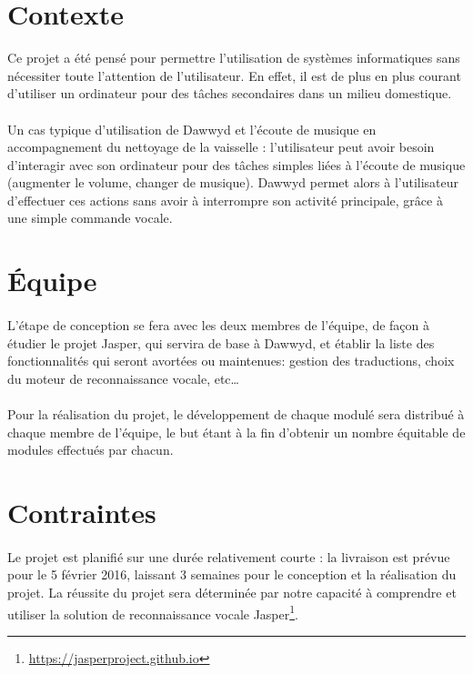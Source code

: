 \documentclass[12pt]{article}
\begin{document}
    \section{Contexte}

Ce projet a été pensé pour permettre l'utilisation de systèmes informatiques
sans nécessiter toute l'attention de l'utilisateur. En effet, il est de plus en
plus courant d'utiliser un ordinateur pour des tâches secondaires dans un
milieu domestique.

\paragraph{}
Un cas typique d'utilisation de Dawwyd et l'écoute de musique
en accompagnement du nettoyage de la vaisselle : l'utilisateur peut avoir
besoin d'interagir avec son ordinateur pour des tâches simples liées à l'écoute
de musique (augmenter le volume, changer de musique).
Dawwyd permet alors à l'utilisateur d'effectuer ces actions sans avoir à
interrompre son activité principale, grâce à une simple commande vocale.

    \section{Équipe}

\paragraph{}
L'étape de conception se fera avec les deux membres de l'équipe, de façon à
étudier le projet Jasper, qui servira de base à Dawwyd, et établir la liste des
fonctionnalités qui seront avortées ou maintenues: gestion des traductions,
choix du moteur de reconnaissance vocale, etc\dots

\paragraph{}
Pour la réalisation du projet, le développement de chaque modulé sera
distribué à chaque membre de l'équipe, le but étant à la fin d'obtenir un
nombre équitable de modules effectués par chacun.

    \section{Contraintes}

\paragraph{}
Le projet est planifié sur une durée relativement courte : la livraison
est prévue pour le 5 février 2016, laissant 3 semaines pour le conception et la
réalisation du projet. La réussite du projet sera déterminée par notre capacité
à comprendre et utiliser la solution de reconnaissance vocale
Jasper\footnote{\url{https://jasperproject.github.io}}.
\end{document}
